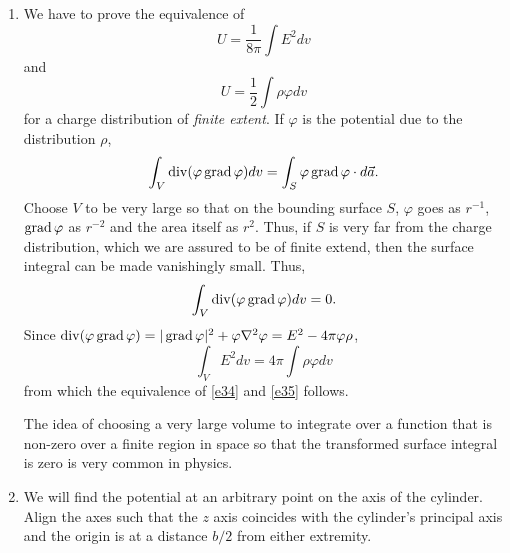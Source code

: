 \documentclass{article}
\begin{document}
\begin{enumerate}
\item We have to prove the equivalence of
\begin{equation}\label{e34}
U = \frac{1}{8\pi}\int E^2 dv
\end{equation}
and
\begin{equation}\label{e35}
U = \frac{1}{2}\int\rho\varphi dv
\end{equation}
for a charge distribution of \emph{finite extent}. If $\varphi$ is the potential
due to the distribution $\rho$,
\[
\int_V \operatorname{div}(\varphi\operatorname{grad}\varphi)dv = \int_S \varphi\operatorname{grad}\varphi\cdot d\vec{a}.
\]
Choose $V$ to be very large so that on the bounding surface $S$, $\varphi$ goes
as $r^{-1}$, $\operatorname{grad}\varphi$ as $r^{-2}$ and the area itself as $r^2$. Thus, if $S$
is very far from the charge distribution, which we are assured to be of finite
extend, then the surface integral can be made vanishingly small. Thus,
\[
\int_V \operatorname{div}(\varphi\operatorname{grad}\varphi)dv = 0.
\]
Since $\operatorname{div}(\varphi\operatorname{grad}\varphi) = |\operatorname{grad}\varphi|^2 + \varphi\nabla^2\varphi =
E^2 - 4\pi\varphi\rho$,
\[
\int_V E^2 dv = 4\pi\int\rho\varphi dv
\]
from which the equivalence of \eqref{e34} and \eqref{e35} follows.

The idea of choosing a very large volume to integrate over a function that is
non-zero over a finite region in space so that the transformed surface integral
is zero is very common in physics.

\item We will find the potential at an arbitrary point on the axis of the cylinder.
Align the axes such that the $z$ axis coincides with the cylinder's principal axis 
and the origin is at a distance $b/2$ from either extremity.


\end{enumerate}
\end{document}
